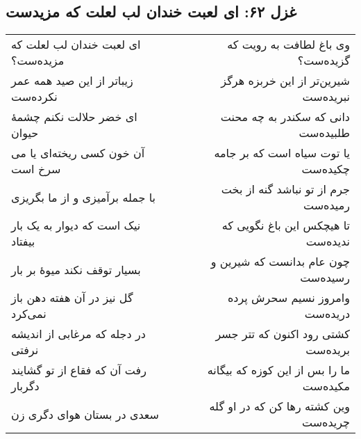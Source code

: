 \begin{center}
\section*{غزل ۶۲: ای لعبت خندان لب لعلت که مزیدست}
\label{sec:062}
\begin{longtable}{l p{0.5cm} r}
ای لعبت خندان لب لعلت که مزیده‌ست؟
&&
وی باغ لطافت به رویت که گزیده‌ست؟
\\
زیباتر از این صید همه عمر نکرده‌ست
&&
شیرین‌تر از این خربزه هرگز نبریده‌ست
\\
ای خضر حلالت نکنم چشمهٔ حیوان
&&
دانی که سکندر به چه محنت طلبیده‌ست
\\
آن خون کسی ریخته‌ای یا می سرخ است
&&
یا توت سیاه است که بر جامه چکیده‌ست
\\
با جمله برآمیزی و از ما بگریزی
&&
جرم از تو نباشد گنه از بخت رمیده‌ست
\\
نیک است که دیوار به یک بار بیفتاد
&&
تا هیچکس این باغ نگویی که ندیده‌ست
\\
بسیار توقف نکند میوهٔ بر بار
&&
چون عام بدانست که شیرین و رسیده‌ست
\\
گل نیز در آن هفته دهن باز نمی‌کرد
&&
وامروز نسیم سحرش پرده دریده‌ست
\\
در دجله که مرغابی از اندیشه نرفتی
&&
کشتی رود اکنون که تتر جسر بریده‌ست
\\
رفت آن که فقاع از تو گشایند دگربار
&&
ما را بس از این کوزه که بیگانه مکیده‌ست
\\
سعدی در بستان هوای دگری زن
&&
وین کشته رها کن که در او گله چریده‌ست
\\
\end{longtable}
\end{center}
